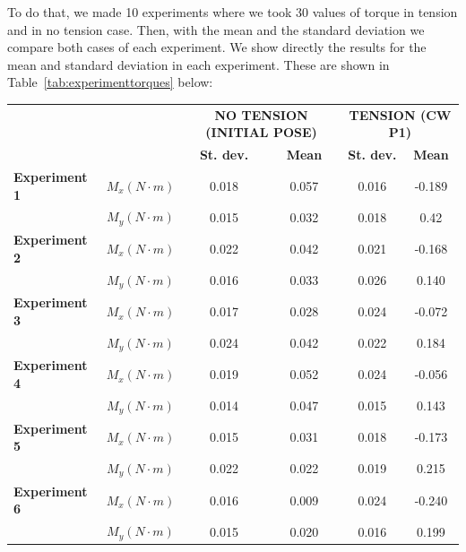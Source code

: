 To  do that, we made 10 experiments where we took 30 values of torque in tension and in no tension case. Then, with the mean and the standard deviation we compare both cases of each experiment. We show directly the results for the mean and standard deviation in each experiment. These are shown in Table~\ref{tab:experimenttorques} below:
\setlength\LTpost{0pt}
\begin{longtable}{|r|c|c|c|c|c|}
		\cmidrule{3-6}    \multicolumn{1}{r}{} &       & \multicolumn{2}{c|}{\textbf{NO TENSION (INITIAL POSE)}} & \multicolumn{2}{c|}{\textbf{TENSION (CW P1)}} \\
		\cmidrule{3-6}    \multicolumn{1}{r}{} &       & \textbf{St. dev.} & \textbf{Mean} & \textbf{St. dev.} & \textbf{Mean} \\
		\midrule
		\multicolumn{1}{|l|}{\textbf{Experiment 1}} & \textbf{$M_{x} (N \cdot m)$} & 0.018 & 0.057 & 0.016 & -0.189 \\
		\cmidrule{2-6}          & \textbf{$M_{y} (N \cdot m)$} & 0.015 & 0.032 & 0.018 & 0.42 \\
		\midrule
		\multicolumn{1}{|l|}{\textbf{Experiment 2}} & \textbf{$M_{x} (N \cdot m)$} & 0.022 & 0.042 & 0.021 & -0.168 \\
		\cmidrule{2-6}          & \textbf{$M_{y} (N \cdot m)$} & 0.016 & 0.033 & 0.026 & 0.140 \\
		\midrule
		\multicolumn{1}{|l|}{\textbf{Experiment 3}} & \textbf{$M_{x} (N \cdot m)$} & 0.017 & 0.028 & 0.024 & -0.072 \\
		\cmidrule{2-6}          & \textbf{$M_{y} (N \cdot m)$} & 0.024 & 0.042 & 0.022 & 0.184 \\
		\midrule
		\multicolumn{1}{|l|}{\textbf{Experiment 4}} & \textbf{$M_{x} (N \cdot m)$} & 0.019 & 0.052 & 0.024 & -0.056 \\
		\cmidrule{2-6}          & \textbf{$M_{y} (N \cdot m)$} & 0.014 & 0.047 & 0.015 & 0.143 \\
		\midrule
		\multicolumn{1}{|l|}{\textbf{Experiment 5}} & \textbf{$M_{x} (N \cdot m)$} & 0.015 & 0.031 & 0.018 & -0.173 \\
		\cmidrule{2-6}          & \textbf{$M_{y} (N \cdot m)$} & 0.022 & 0.022 & 0.019 & 0.215 \\
		\midrule
		\multicolumn{1}{|l|}{\textbf{Experiment 6}} & \textbf{$M_{x} (N \cdot m)$} & 0.016 & 0.009 & 0.024 & -0.240 \\
		\cmidrule{2-6}          & \textbf{$M_{y} (N \cdot m)$} & 0.015 & 0.020 & 0.016 & 0.199 \\

\end{longtable}
